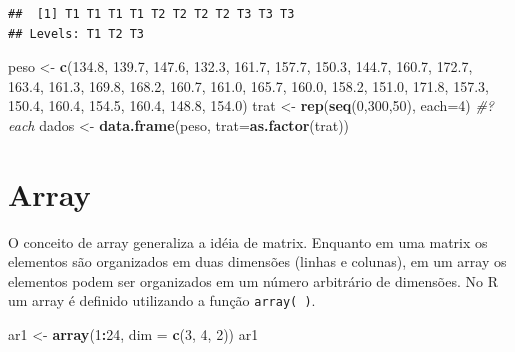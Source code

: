 \documentclass[]{book}
\newenvironment{Shaded}{\begin{snugshade}}{\end{snugshade}}
\newcommand{\CommentTok}[1]{\textcolor[rgb]{0.56,0.35,0.01}{\textit{#1}}}
\newcommand{\DataTypeTok}[1]{\textcolor[rgb]{0.13,0.29,0.53}{#1}}
\newcommand{\DecValTok}[1]{\textcolor[rgb]{0.00,0.00,0.81}{#1}}
\newcommand{\FloatTok}[1]{\textcolor[rgb]{0.00,0.00,0.81}{#1}}
\newcommand{\KeywordTok}[1]{\textcolor[rgb]{0.13,0.29,0.53}{\textbf{#1}}}
\newcommand{\NormalTok}[1]{#1}
\newcommand{\OperatorTok}[1]{\textcolor[rgb]{0.81,0.36,0.00}{\textbf{#1}}}
\newcommand{\StringTok}[1]{\textcolor[rgb]{0.31,0.60,0.02}{#1}}
\begin{document}
\begin{verbatim}
##  [1] T1 T1 T1 T1 T2 T2 T2 T2 T3 T3 T3
## Levels: T1 T2 T3
\end{verbatim}

\begin{Shaded}
\begin{Highlighting}[]
\NormalTok{peso  <-}\StringTok{ }\KeywordTok{c}\NormalTok{(}\FloatTok{134.8}\NormalTok{, }\FloatTok{139.7}\NormalTok{, }\FloatTok{147.6}\NormalTok{, }\FloatTok{132.3}\NormalTok{, }\FloatTok{161.7}\NormalTok{, }\FloatTok{157.7}\NormalTok{, }\FloatTok{150.3}\NormalTok{, }\FloatTok{144.7}\NormalTok{,}
           \FloatTok{160.7}\NormalTok{, }\FloatTok{172.7}\NormalTok{, }\FloatTok{163.4}\NormalTok{, }\FloatTok{161.3}\NormalTok{, }\FloatTok{169.8}\NormalTok{, }\FloatTok{168.2}\NormalTok{, }\FloatTok{160.7}\NormalTok{, }\FloatTok{161.0}\NormalTok{,}
           \FloatTok{165.7}\NormalTok{, }\FloatTok{160.0}\NormalTok{, }\FloatTok{158.2}\NormalTok{, }\FloatTok{151.0}\NormalTok{, }\FloatTok{171.8}\NormalTok{, }\FloatTok{157.3}\NormalTok{, }\FloatTok{150.4}\NormalTok{, }\FloatTok{160.4}\NormalTok{,}
           \FloatTok{154.5}\NormalTok{, }\FloatTok{160.4}\NormalTok{, }\FloatTok{148.8}\NormalTok{, }\FloatTok{154.0}\NormalTok{)}
\NormalTok{trat  <-}\StringTok{ }\KeywordTok{rep}\NormalTok{(}\KeywordTok{seq}\NormalTok{(}\DecValTok{0}\NormalTok{,}\DecValTok{300}\NormalTok{,}\DecValTok{50}\NormalTok{), }\DataTypeTok{each=}\DecValTok{4}\NormalTok{)  }\CommentTok{#?each}
\NormalTok{dados <-}\StringTok{  }\KeywordTok{data.frame}\NormalTok{(peso, }\DataTypeTok{trat=}\KeywordTok{as.factor}\NormalTok{(trat))}
\end{Highlighting}
\end{Shaded}

\hypertarget{array}{%
\section{Array}\label{array}}

O conceito de array generaliza a idéia de matrix. Enquanto em uma matrix os elementos são organizados em duas dimensões (linhas e colunas), em um array os elementos podem ser organizados em um número arbitrário de dimensões.
No R um array é definido utilizando a função \texttt{array(\ )}.

\begin{Shaded}
\begin{Highlighting}[]
\NormalTok{ar1 <-}\StringTok{ }\KeywordTok{array}\NormalTok{(}\DecValTok{1}\OperatorTok{:}\DecValTok{24}\NormalTok{, }\DataTypeTok{dim =} \KeywordTok{c}\NormalTok{(}\DecValTok{3}\NormalTok{, }\DecValTok{4}\NormalTok{, }\DecValTok{2}\NormalTok{)) }
\NormalTok{ar1}
\end{Highlighting}
\end{Shaded}
\end{document}
